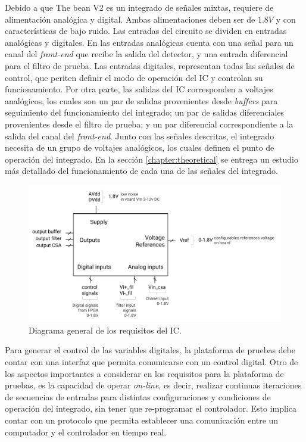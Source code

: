 	Debido a que The bean V2 es un integrado de señales mixtas, requiere de alimentación analógica y digital. Ambas alimentaciones deben ser de $1.8V$ y con características de bajo ruido. Las entradas del circuito se dividen en entradas analógicas y digitales. En las entradas analógicas cuenta con una señal para un canal del \textit{front-end} que recibe la salida del detector, y una entrada diferencial para el filtro de prueba. Las entradas digitales, representan todas las señales de control, que periten definir el modo de operación del IC y controlan su funcionamiento. Por otra parte, las salidas del IC corresponden a voltajes analógicos, los cuales son un par de salidas provenientes desde \textit{buffers} para seguimiento del funcionamiento del integrado; un par de salidas diferenciales provenientes desde el filtro de prueba; y un par diferencial correspondiente a la salida del canal del \textit{front-end}. Junto con las señales descritas, el integrado necesita de un grupo de voltajes analógicos, los cuales definen el punto de operación del integrado. En la sección \ref{chapter:theoretical} se entrega un estudio más detallado del funcionamiento de cada una de las señales del integrado. 

\begin{figure}[!t]
	\centering
	\includegraphics[width=6in]{./figures/especificiaciones-01}
	\caption{Diagrama general de los requisitos del IC.}\label{fig:thebean_spec}
\end{figure}



Para generar el control de las variables digitales, la plataforma de pruebas debe contar con una interfaz que permita comunicarse con un control digital. Otro de los aspectos importantes a considerar en los requisitos para la plataforma de pruebas, es la capacidad de operar \textit{on-line}, es decir, realizar continuas iteraciones de secuencias de entradas para distintas configuraciones y condiciones de operación del integrado, sin tener que re-programar el controlador. Esto implica contar con un protocolo que permita establecer una comunicación entre un computador y el controlador en tiempo real.


